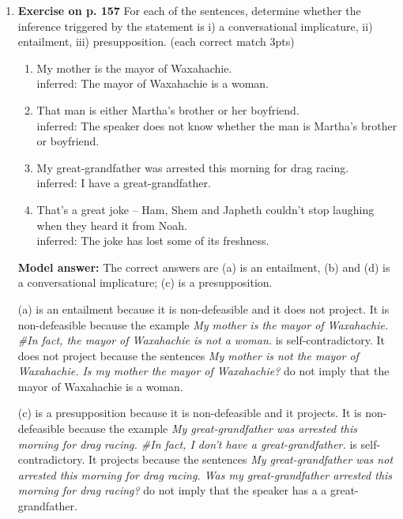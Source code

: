 \documentclass[a4,11pt]{article}
\newcommand{\6}{\mbox{$[\hspace*{-.6mm}[$}}
\newcommand{\9}{\mbox{$]\hspace*{-.6mm}]$}}
\begin{document}
\begin{enumerate}[leftmargin = 12pt]
{ \bf Model answer:} As per CC p.28, implicatures are defeasible and reinforceable. Entailment are not defeasible nor reinforceable and they do not project over entailment-cancelling operators. Presupposition are not defeasible nor reinforceable but they do project over entailment-cancelling operators. 

\item  { \bf Exercise on p. 157} For each of the sentences, determine whether the inference triggered by the statement is i) a conversational implicature, ii) entailment, iii) presupposition. (each correct match 3pts)


\begin{enumerate}[noitemsep]
\item My mother is the mayor of Waxahachie. \\ 
	inferred: The mayor of Waxahachie is a woman.
\item That man is either Martha’s brother or her boyfriend.  \\
	inferred: The speaker does not know whether the man is Martha’s brother or boyfriend.
\item My great-grandfather was arrested this morning for drag racing. \\  
	inferred:  I have a great-grandfather.
\item That’s a great joke – Ham, Shem and Japheth couldn’t stop laughing when they heard it from Noah. \\  
	inferred: The joke has lost some of its freshness.
\end{enumerate}


{ \bf Model answer:} The correct answers are (a) is an entailment, (b) and (d) is a conversational implicature; (c) is a presupposition. 

(a) is an entailment because it is non-defeasible and it does not project. It is non-defeasible because the example {\it My mother is the mayor of Waxahachie. \#In fact, the mayor of Waxahachie is not a woman.} is self-contradictory. It does not project because the sentences  {\it My mother is not the mayor of Waxahachie. Is my mother the mayor of Waxahachie?} do not imply that the mayor of Waxahachie is a woman.

(c) is a presupposition because it is non-defeasible and it projects.  It is non-defeasible because the example {\it  My great-grandfather was arrested this morning for drag racing. \#In fact, I don't have a great-grandfather.} is self-contradictory. It projects because the sentences  {\it My great-grandfather was not arrested this morning for drag racing. Was my great-grandfather arrested this morning for drag racing?} do not imply that the speaker has a a great-grandfather.


\end{enumerate}
\end{document}
